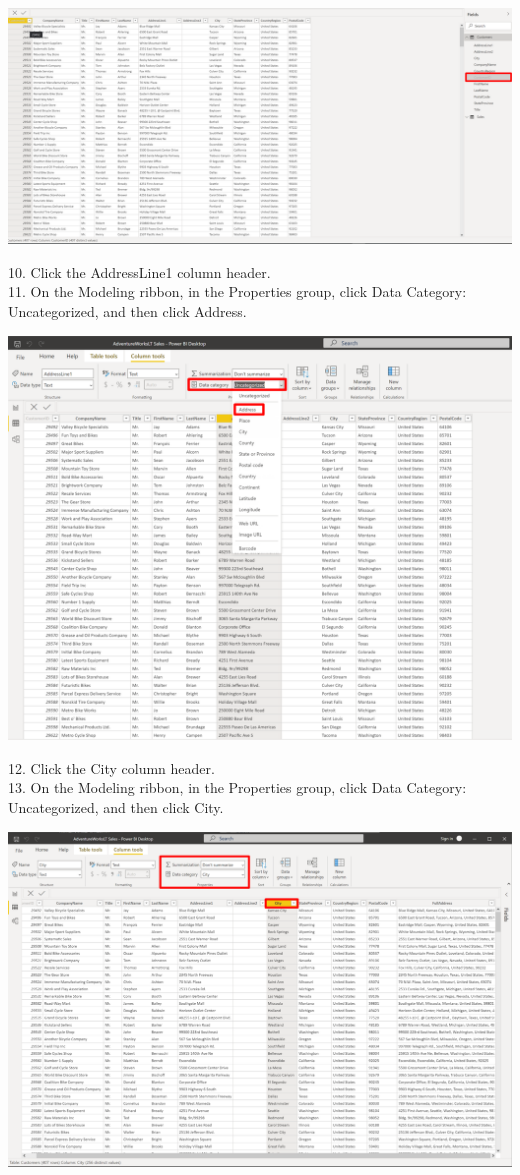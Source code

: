 \documentclass[12pt,letterpaper]{article}
\begin{document}
\begin{center}
    \includegraphics[width=17cm]{img/27.png}  
\end{center}
10. Click the AddressLine1 column header.
\\11. On the Modeling ribbon, in the Properties group, click Data Category: Uncategorized, and then click
Address.
\begin{center}
    \includegraphics[width=16cm]{img/28.png}  
\end{center}
12. Click the City column header.
\\13. On the Modeling ribbon, in the Properties group, click Data Category: Uncategorized, and then click City.
\begin{center}
    \includegraphics[width=15.5cm]{img/116.png}  
\end{center}
\end{document}
